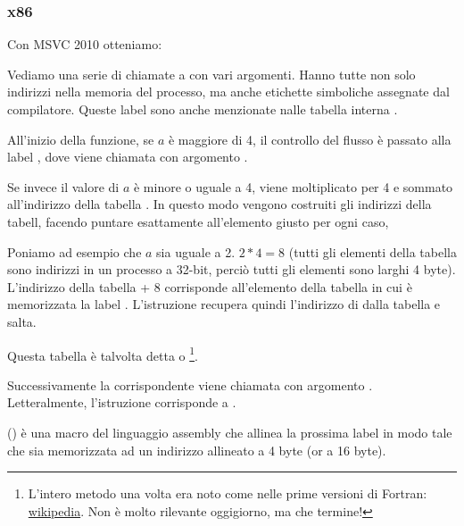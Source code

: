 \subsubsection{x86}


Con MSVC 2010 otteniamo:




Vediamo una serie di chiamate a \printf con vari argomenti. Hanno tutte non solo indirizzi nella memoria del processo, ma anche etichette
simboliche assegnate dal compilatore. Queste label sono anche menzionate nalle tabella interna .

All'inizio della funzione, se $a$ è maggiore di 4, il controllo del flusso è passato alla label 
, dove viene chiamata \printf con argomento .

Se invece il valore di $a$ è minore o uguale a 4, viene moltiplicato per 4 e sommato all'indirizzo della tabella . 
In questo modo vengono costruiti gli indirizzi della tabell, facendo puntare esattamente all'elemento giusto per ogni caso,

Poniamo ad esempio che $a$ sia uguale a 2. $2*4 = 8$ (tutti gli elementi della tabella sono indirizzi in un processo a 32-bit, perciò tutti gli elementi sono larghi 4 byte).
L'indirizzo della tabella  + 8 corrisponde all'elemento della tabella in cui è memorizzata la label .
L'istruzione \JMP recupera quindi l'indirizzo di  dalla tabella e salta.

Questa tabella è talvolta detta  o \footnote{L'intero metodo una volta era noto come 
 nelle prime versioni di Fortran:
\href{http://go.yurichev.com/17122}{wikipedia}.
Non è molto rilevante oggigiorno, ma che termine!}.

Successivamente la corrispondente \printf viene chiamata con argomento .\\
Letteralmente, l'istruzione  corrisponde a 
 .

 () è una macro del linguaggio assembly che allinea la prossima label in modo tale che sia memorizzata 
ad un indirizzo allineato a 4 byte (or a 16 byte).


